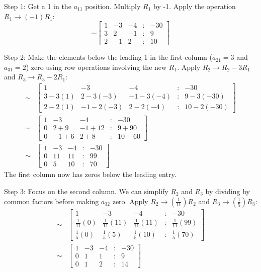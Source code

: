 \documentclass{article}
\begin{document}
Step 1: Get a 1 in the $a_{11}$ position. Multiply $R_1$ by -1.
Apply the operation $R_1 \to (-1)R_1$:
\[ \sim \begin{bmatrix} 1 & -3 & -4 & : & -30 \\ 3 & 2 & -1 & : & 9 \\ 2 & -1 & 2 & : & 10 \end{bmatrix} \]

Step 2: Make the elements below the leading 1 in the first column ($a_{21}=3$ and $a_{31}=2$) zero using row operations involving the new $R_1$.
Apply $R_2 \to R_2 - 3R_1$ and $R_3 \to R_3 - 2R_1$:
\begin{align*} \sim &\begin{bmatrix} 1 & -3 & -4 & : & -30 \\ 3 - 3(1) & 2 - 3(-3) & -1 - 3(-4) & : & 9 - 3(-30) \\ 2 - 2(1) & -1 - 2(-3) & 2 - 2(-4) & : & 10 - 2(-30) \end{bmatrix} \\ \sim &\begin{bmatrix} 1 & -3 & -4 & : & -30 \\ 0 & 2 + 9 & -1 + 12 & : & 9 + 90 \\ 0 & -1 + 6 & 2 + 8 & : & 10 + 60 \end{bmatrix} \\ \sim &\begin{bmatrix} 1 & -3 & -4 & : & -30 \\ 0 & 11 & 11 & : & 99 \\ 0 & 5 & 10 & : & 70 \end{bmatrix}\end{align*}
The first column now has zeros below the leading entry.

Step 3: Focus on the second column. We can simplify $R_2$ and $R_3$ by dividing by common factors before making $a_{32}$ zero.
Apply $R_2 \to (\frac{1}{11})R_2$ and $R_3 \to (\frac{1}{5})R_3$:
\begin{align*} \sim &\begin{bmatrix} 1 & -3 & -4 & : & -30 \\ \frac{1}{11}(0) & \frac{1}{11}(11) & \frac{1}{11}(11) & : & \frac{1}{11}(99) \\ \frac{1}{5}(0) & \frac{1}{5}(5) & \frac{1}{5}(10) & : & \frac{1}{5}(70) \end{bmatrix} \\ \sim &\begin{bmatrix} 1 & -3 & -4 & : & -30 \\ 0 & 1 & 1 & : & 9 \\ 0 & 1 & 2 & : & 14 \end{bmatrix}\end{align*}
\end{document}
